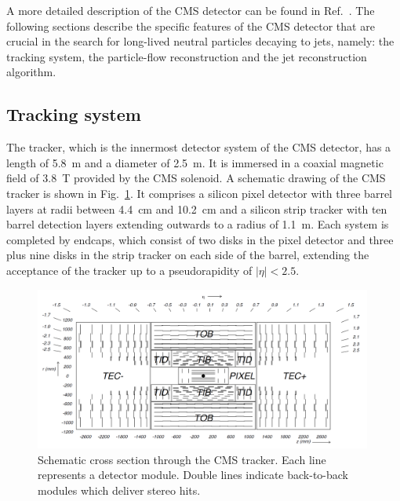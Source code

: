 A more detailed description of the CMS detector can be found in Ref.~\cite{Chatrchyan:2008zzk}.  
The following sections describe the specific features of the CMS detector
that are crucial in the search for long-lived neutral particles decaying to jets, namely: the
tracking system, the particle-flow reconstruction and the jet reconstruction algorithm.

\subsection{Tracking system}
\label{subsec:trackreco}

The tracker, which is the innermost detector system of the CMS detector, has a length
of 5.8~m and a
diameter of 2.5~m. It is immersed in a coaxial magnetic field of 3.8~T
provided by the CMS solenoid. A schematic drawing of the CMS tracker is shown in
Fig.~\ref{fig:tracker}. It comprises a silicon pixel detector with three barrel layers at radii
between 4.4~cm and 10.2~cm and a silicon strip tracker with ten barrel
detection layers extending outwards to a radius of 1.1~m. Each system is
completed by endcaps, which consist of two disks in the pixel detector and three
plus nine disks in the strip tracker on each side of the barrel, extending
the acceptance of the tracker up to a pseudorapidity of $|\eta| < 2.5$.
\begin{figure}[!h]
\centering
\includegraphics[width=0.99\textwidth]{plots/intro/tracker.png}
\caption{Schematic cross section through the CMS tracker. Each line represents a
detector module. Double lines indicate back-to-back modules which deliver stereo
hits.\label{fig:tracker}}
\end{figure}

